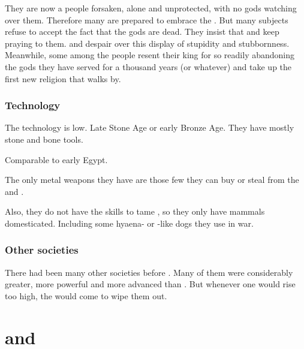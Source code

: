 They are now a people forsaken, alone and unprotected, with no gods watching over them. 
Therefore many are prepared to embrace the \banes. 
But many subjects refuse to accept the fact that the gods are dead. 
They insist that  and keep praying to them. 
\Semiza{} and \Eshayzal{} despair over this display of stupidity and stubbornness. 
Meanwhile, some among the people resent their king for so readily abandoning the gods they have served for a thousand years (or whatever) and take up the first new religion that walks by. 





\subsubsection{Technology}
The technology is low. 
Late Stone Age or early Bronze Age. 
They have mostly stone and bone tools. 

Comparable to early Egypt. 

The only metal weapons they have are those few they can buy or steal from the \scathae{} and \cregorrs. 

Also, they do not have the skills to tame \saurians{}, so they only have mammals domesticated. 
Including some hyaena- or -like dogs they use in war. 





\subsubsection{Other \nephilic{} societies}
There had been many other \nephilic{} societies before \Girigor. 
Many of them were considerably greater, more powerful and more advanced than \Girigor. 
But whenever one would rise too high, the \scathae{} would come to wipe them out. 















\section{\Semiza{} and \Ilu}










